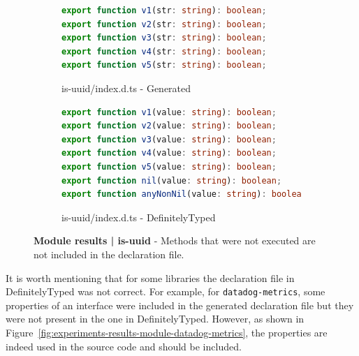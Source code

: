 \documentclass[a4paper,english,cleveref, autoref]{lipics-v2019}
\newcommand{\figref}[1]{Figure~\ref{#1}}
\begin{document}
\begin{figure}[tp]
    \centering
    \begin{subfigure}{0.48\linewidth}
      \begin{lstlisting}[language=TypeScript]
export function v1(str: string): boolean;
export function v2(str: string): boolean;
export function v3(str: string): boolean;
export function v4(str: string): boolean;
export function v5(str: string): boolean;
      \end{lstlisting}
      \caption{is-uuid/index.d.ts - Generated}
    \end{subfigure}
    \hfill
    \begin{subfigure}{0.48\linewidth}
      \begin{lstlisting}[language=TypeScript]
export function v1(value: string): boolean;
export function v2(value: string): boolean;
export function v3(value: string): boolean;
export function v4(value: string): boolean;
export function v5(value: string): boolean;
export function nil(value: string): boolean;
export function anyNonNil(value: string): boolean;
      \end{lstlisting}
      \caption{is-uuid/index.d.ts - DefinitelyTyped}
    \end{subfigure}

    \caption{\textbf{Module results | is-uuid} - Methods that were not executed are not included in the declaration file.}
    \label{fig:experiments-results-module-is-uuid}
\end{figure}

It is worth mentioning that for some libraries the declaration file in DefinitelyTyped was not correct. For example, for \texttt{datadog-metrics}, some properties of an interface were included in the generated declaration file but they were not present in the one in DefinitelyTyped. However, as shown in \figref{fig:experiments-results-module-datadog-metrics}, the properties are indeed used in the source code and should be included.
\end{document}
